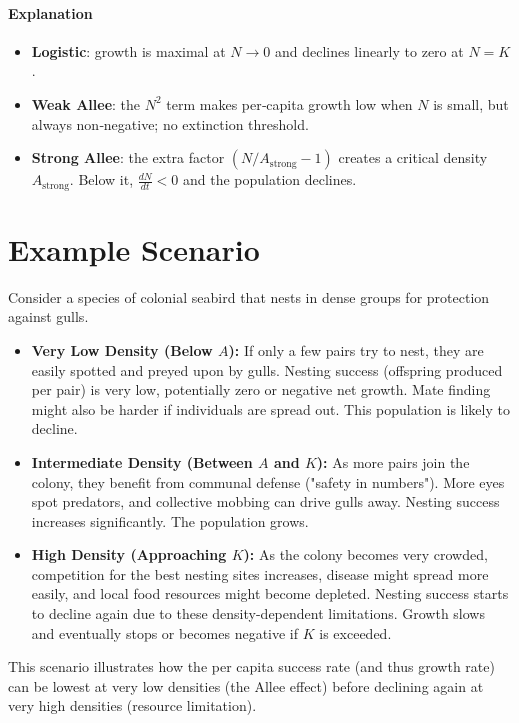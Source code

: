 \documentclass{article}
\begin{document}
\paragraph{Explanation}
\begin{itemize}
  \item \textbf{Logistic}: growth is maximal at \(N\!\to\!0\) and declines linearly to zero at \(N=K\).
  \item \textbf{Weak Allee}: the \(N^2\) term makes per‐capita growth low when \(N\) is small, but always non‐negative; no extinction threshold.
  \item \textbf{Strong Allee}: the extra factor \((N/A_\text{strong}-1)\) creates a critical density \(A_\text{strong}\). Below it, \(\tfrac{dN}{dt}<0\) and the population declines.
\end{itemize}



\section{Example Scenario}

Consider a species of colonial seabird that nests in dense groups for protection against gulls.
\begin{itemize}
    \item \textbf{Very Low Density (Below $A$):} If only a few pairs try to nest, they are easily spotted and preyed upon by gulls. Nesting success (offspring produced per pair) is very low, potentially zero or negative net growth. Mate finding might also be harder if individuals are spread out. This population is likely to decline.
    \item \textbf{Intermediate Density (Between $A$ and $K$):} As more pairs join the colony, they benefit from communal defense ("safety in numbers"). More eyes spot predators, and collective mobbing can drive gulls away. Nesting success increases significantly. The population grows.
    \item \textbf{High Density (Approaching $K$):} As the colony becomes very crowded, competition for the best nesting sites increases, disease might spread more easily, and local food resources might become depleted. Nesting success starts to decline again due to these density-dependent limitations. Growth slows and eventually stops or becomes negative if $K$ is exceeded.
\end{itemize}
This scenario illustrates how the per capita success rate (and thus growth rate) can be lowest at very low densities (the Allee effect) before declining again at very high densities (resource limitation).
\end{document}
